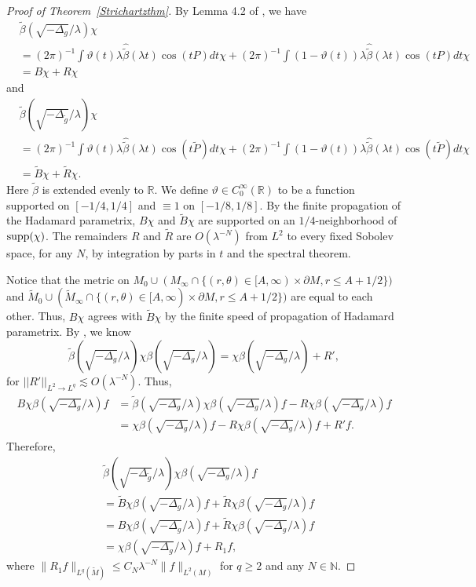 \documentclass[11pt]{amsart}
\newcommand{\la}{\lambda}
\begin{document}
\begin{proof}[Proof of Theorem~\ref{Strichartzthm}]
By Lemma 4.2 of \cite{HSTZ}, we have\begin{align*}
    &\tilde\beta(\sqrt{-\Delta_{g}}/\la) \chi\\
    &=(2\pi)^{-1}\int \vartheta(t)\lambda\widehat{\tilde\beta}(\lambda t)\cos(tP)dt\chi+(2\pi)^{-1}\int (1-\vartheta(t))\lambda\widehat{\tilde\beta}(\lambda t)\cos(tP)dt\chi\\
    &=B\chi+R\chi
\end{align*}
 and 
 \begin{align*}
    &\tilde\beta(\sqrt{-\Delta_{\tilde g}}/\la) \chi\\
    &=(2\pi)^{-1}\int \vartheta(t)\lambda\widehat{\tilde\beta}(\lambda t)\cos(t\tilde P)dt\chi+(2\pi)^{-1}\int (1-\vartheta(t))\lambda\widehat{\tilde\beta}(\lambda t)\cos(t\tilde P)dt\chi\\
    &=\tilde B\chi+\tilde R\chi.
\end{align*}
Here $\tilde\beta$ is extended evenly to $\mathbb R$. We define $\vartheta\in C_0^\infty(\mathbb R)$ to be a function supported on $[-1/4,1/4]$ and $\equiv 1$ on $[-1/8,1/8]$. By the finite propagation of the Hadamard parametrix, $B\chi$ and $\tilde B\chi$ are supported on an $1/4$-neighborhood of $\textnormal{supp}(\chi)$. The remainders $R$ and $\tilde R$ are $O(\la^{-N})$ from $L^2$ to every fixed Sobolev space, for any $N$, by integration by parts in $t$ and the spectral theorem.

Notice that the metric on $M_0\cup (M_\infty\cap\{(r,\theta)\in [A,\infty)\times\partial M, r\leq A+1/2\})$ and $\tilde M_0\cup (\tilde M_\infty\cap\{(r,\theta)\in [A,\infty)\times\partial M, r\leq A+1/2\})$ are equal to each other. Thus, $B\chi$ agrees with $\tilde B\chi$ by the finite speed of propagation of Hadamard parametrix. By \cite[(2.7)]{HSTZ}, we know
$$\tilde\beta(\sqrt{-\Delta_{ g}}/\la) \chi\beta(\sqrt{-\Delta_{g}}/\la)=\chi\beta(\sqrt{-\Delta_{g}}/\la)+R',$$ for $||R'||_{L^2\to L^q}\lesssim O(\lambda^{-N})$. Thus, 
\begin{align}
\begin{split}
    B\chi
\beta(\sqrt{-\Delta_{g}}/\la)f&=\tilde\beta(\sqrt{-\Delta_{ g}}/\la) \chi\beta(\sqrt{-\Delta_{g}}/\la)f-R\chi\beta(\sqrt{-\Delta_{g}}/\la)f\\
&=\chi
\beta(\sqrt{-\Delta_{g}}/\la)f-R\chi \beta(\sqrt{-\Delta_{g}}/\la)f+R'f.
\end{split}
\end{align} Therefore,
\begin{align*}
    &\tilde\beta(\sqrt{-\Delta_{\tilde g}}/\la) \chi
\beta(\sqrt{-\Delta_{g}}/\la)f\\
&= \tilde B \chi
\beta(\sqrt{-\Delta_{g}}/\la)f+\tilde R\chi
\beta(\sqrt{-\Delta_{g}}/\la)f\\
&=B\chi
\beta(\sqrt{-\Delta_{g}}/\la)f+\tilde R \chi
\beta(\sqrt{-\Delta_{g}}/\la)f\\
&=\chi
\beta(\sqrt{-\Delta_{g}}/\la)f+R_1f,
\end{align*}
where $\|R_1f\|_{L^q(\tilde M)}\le C_N\la^{-N}\|f\|_{L^2(M)}$  for $q\ge2$ and any $N\in \mathbb{N}$. 


\end{proof}
\end{document}
